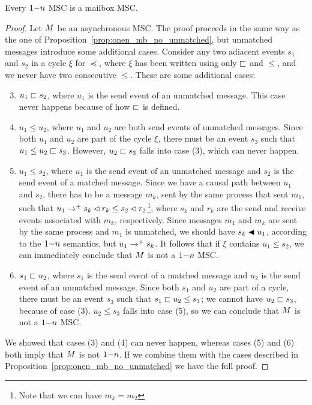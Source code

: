 \begin{proposition}%
	Every $1\mathsf{-}n$ MSC is a mailbox MSC.
\end{proposition}
\begin{proof}
Let $M$ be an asynchronous MSC. The proof proceeds in the same way as the one of Proposition~\ref{prop:onen_mb_no_unmatched}, but unmatched messages introduce some additional cases. Consider any two adiacent events $s_1$ and $s_2$ in a cycle $\xi$ for $\preceq$, where $\xi$ has been written using only $\sqsubset$ and $\le$, and we never have two consecutive $\le$. These are some additional cases:
\begin{enumerate}\setcounter{enumi}{2}
	\item $u_1 \sqsubset s_2$, where $u_1$ is the send event of an unmatched message. This case never happens because of how $\sqsubset$ is defined.
	\item $u_1 \le u_2$, where $u_1$ and $u_2$ are both send events of unmatched messages. Since both $u_1$ and $u_2$ are part of the cycle $\xi$, there must be an event $s_3$ such that $u_1 \le u_2 \sqsubset s_3$. However, $u_2 \sqsubset s_3$ falls into case (3), which can never happen.
	\item $u_1 \le s_2$, where $u_1$ is the send event of an unmatched message and $s_2$ is the send event of a matched message. Since we have a causal path between $u_1$ and $s_2$, there has to be a message $m_k$, sent by the same process that sent $m_1$, such that $u_1 \to^+ s_k \lhd r_k \le s_2 \lhd r_2$\footnote{Note that we can have $m_k = m_2$}, where $s_k$ and $r_k$ are the send and receive events associated with $m_k$, respectively. Since messages $m_1$ and $m_k$ are sent by the same process and $m_1$ is unmatched, we should have $s_k \blacktriangleleft u_1$, according to the $1\mathsf{-}n$ semantics, but $u_1 \to^+ s_k$. It follows that if $\xi$ contains $u_1 \le s_2$, we can immediately conclude that $M$ is not a $1\mathsf{-}n$ MSC.
	\item $s_1 \sqsubset u_2$,  where $s_1$ is the send event of a matched message and $u_2$ is the send event of an unmatched message. Since both $s_1$ and $u_2$ are part of a cycle, there must be an event $s_3$ such that $s_1 \sqsubset u_2 \le s_3$; we cannot have $u_2 \sqsubset s_3$, because of case (3). $u_2 \le s_3$ falls into case (5), so we can conclude that $M$ is not a $1\mathsf{-}n$ MSC.
\end{enumerate}
We showed that cases (3) and (4) can never happen, whereas cases (5) and (6) both imply that $M$ is not $1\mathsf{-}n$. If we combine them with the cases described in Proposition~\ref{prop:onen_mb_no_unmatched} we have the full proof.
\end{proof}

